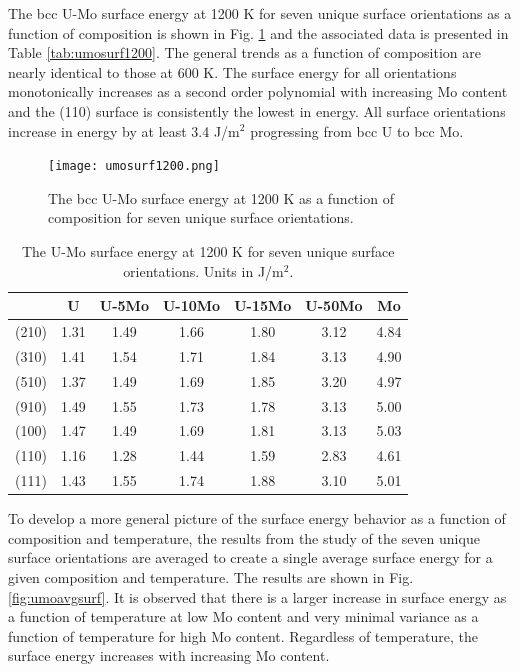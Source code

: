 \documentclass[review]{elsarticle}
\begin{document}
\FloatBarrier

The bcc U-Mo surface energy at 1200 K for seven unique surface orientations as a function of composition is shown in Fig. \ref{fig:umosurf1200} and the associated data is presented in Table \ref{tab:umosurf1200}. The general trends as a function of composition are nearly identical to those at 600 K. The surface energy for all orientations monotonically increases as a second order polynomial with increasing Mo content and the (110) surface is consistently the lowest in energy. All surface orientations increase in energy by at least 3.4 J/m$^{2}$ progressing from bcc U to bcc Mo. 

\begin{figure}[h]
 \centering
 \texttt{[image: umosurf1200.png]} 
 \caption{The bcc U-Mo surface energy at 1200 K as a function of composition for seven unique surface orientations.}
 \label{fig:umosurf1200}
\end{figure}

\begin{table}[h]
\caption{The U-Mo surface energy at 1200 K for seven unique surface orientations. Units in J/m$^{2}$.} \label{tab:umosurf1200}
\begin{center}
\begin{tabular}{|c|c|c|c|c|c|c|}
	\hline
 & U & U-5Mo & U-10Mo & U-15Mo & U-50Mo & Mo \\
\hline
(210) & 1.31 & 1.49 & 1.66 & 1.80 & 3.12 & 4.84 \\
(310)	 & 1.41 & 1.54 & 1.71 & 1.84 & 3.13 & 4.90 \\ 
(510)	 & 1.37 & 1.49 & 1.69 & 1.85 & 3.20 & 4.97 \\
(910)	 & 1.49 & 1.55 & 1.73 & 1.78 & 3.13 & 5.00 \\
(100)	 & 1.47 & 1.49 & 1.69 & 1.81 & 3.13 & 5.03 \\
(110)	 & 1.16 & 1.28 & 1.44 & 1.59 & 2.83 & 4.61 \\
(111)	 & 1.43 & 1.55 & 1.74 & 1.88 & 3.10 & 5.01 \\
 	 \hline
\end{tabular}
\end{center}
\label{default}
\end{table}

\FloatBarrier

To develop a more general picture of the surface energy behavior as a function of composition and temperature, the results from the study of the seven unique surface orientations are averaged to create a single average surface energy for a given composition and temperature. The results are shown in Fig. \ref{fig:umoavgsurf}. It is observed that there is a larger increase in surface energy as a function of temperature at low Mo content and very minimal variance as a function of temperature for high Mo content. Regardless of temperature, the surface energy increases with increasing Mo content. 
\end{document}
